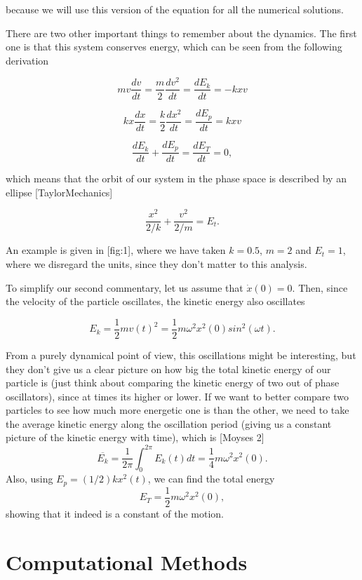 because we will use this version of the equation for all the numerical solutions. 

There are two other important things to remember about the dynamics. The first one is that this system conserves energy, which can be seen from the following derivation

$$m v\frac{d v}{dt} = \frac{m}{2}\frac{d v^2}{dt} = \frac{d E_k}{dt} = -k x v$$

$$k x\frac{d x}{dt} = \frac{k}{2}\frac{d x^2}{dt}= \frac{d E_p}{dt} = k x v$$

$$\frac{d E_k}{dt} + \frac{d E_p}{dt} = \frac{d E_T}{dt} = 0,$$

which means that the orbit of our system in the phase space is described by an ellipse [TaylorMechanics]

$$ \frac{x^2}{2/k} + \frac{v^2}{2/m} = E_t .$$

An example is given in [fig:1], where we have taken $k=0.5$, $m=2$ and $E_t=1$, where we disregard the units, since they don't matter to this analysis.


To simplify our second commentary, let us assume that $\Dot{x}(0)=0$. Then, since the velocity of the particle oscillates, the kinetic energy also oscillates

$$E_k = \frac{1}{2}mv(t)^2 = \frac{1}{2} m\omega^2 x^2(0) sin^2(\omega t) .$$

From a purely dynamical point of view, this oscillations might be interesting, but they don't give us a clear picture on how big the total kinetic energy of our particle is (just think about comparing the kinetic energy of two out of phase oscillators), since at times its higher or lower. If we want to better compare two particles to see how much more energetic one is than the other, we need to take the average kinetic energy along the oscillation period (giving us a constant picture of the kinetic energy with time), which is [Moyses 2]
$$\overline{E_k} = \frac{1}{2 \pi}\int_{0}^{2 \pi}E_k(t) dt = \frac{1}{4} m \omega^2 x^2(0) .$$
Also, using $E_p = (1/2)kx^2(t)$, we can find the total energy 
$$E_T = \frac{1}{2}m\omega^2 x^2(0) ,$$
showing that it indeed is a constant of the motion.

\section{Computational Methods}

